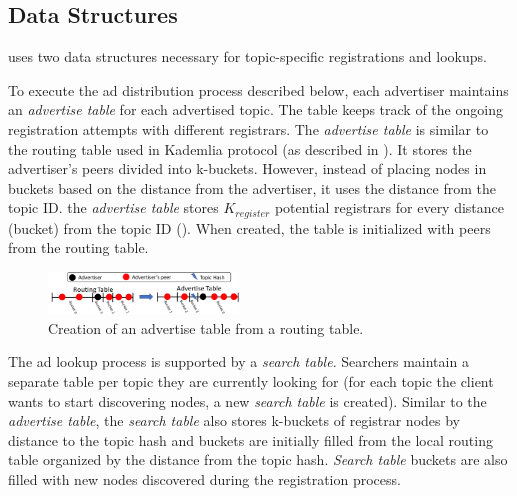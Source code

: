 \subsection{Data Structures}\label{sec:struct}
\sysname uses two data structures necessary for topic-specific registrations and lookups. 

To execute the ad distribution process described below, each advertiser maintains an \emph{advertise table} for each advertised topic. The table keeps track of the ongoing registration attempts with different registrars. The \emph{advertise table} is similar to the routing table used in Kademlia protocol (as described in ). It stores the advertiser's peers divided into k-buckets. However, instead of placing nodes in buckets based on the distance from the advertiser, it uses the distance from the topic ID. \Ie the \emph{advertise table} stores $K_\textit{register}$ potential registrars for every distance (bucket) from the topic ID (). When created, the table is initialized with peers from the routing table. 

\begin{figure}
    \includegraphics[width=0.45\textwidth]{img/tables}
    \vspace{-0.05in}
    \caption{Creation of an advertise table from a routing table.} %
    \label{fig:advertise_table}
    \vspace{-0.15in}
 \end{figure}

The ad lookup process is supported by a \emph{search table}. 
Searchers maintain a separate table per topic they are currently looking for (\ie for each topic the client wants to start discovering nodes, a new \emph{search table} is created). 
Similar to the \emph{advertise table}, the \emph{search table} also stores k-buckets of registrar nodes by distance to the topic hash and buckets are initially filled from the local routing table organized by the distance from the topic hash.
\emph{Search table} buckets are also filled with new nodes discovered during the registration process.


